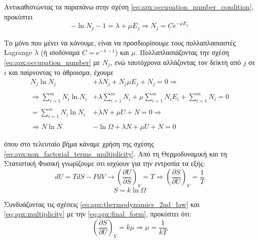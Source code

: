 Αντικαθιστώντας τα παραπάνω στην σχέση \eqref{eq:apx:occupation_number_condition}, προκύπτει
\begin{equation}
    \label{eq:apx:occupation_number}
    - \ln{N_j} - 1 = \lambda + \mu E_j \Rightarrow N_j = C e^{-\mu E_j}
\end{equation}

Το μόνο που μένει να κάνουμε, είναι να προσδιορίσουμε τους πολλαπλασιαστές Lagrange $\lambda$ (ή ισοδύναμα $C = e^{-\lambda - 1}$) και $\mu$. Πολλαπλασιάζοντας την σχέση \eqref{eq:apx:occupation_number} με $N_j$, ενώ ταυτόχρονα αλλάζοντας τον δείκτη από $j$ σε $i$ και παίρνοντας το άθροισμα, έχουμε
\begin{align}
    \label{eq:apx:final_form}
   \nonumber N_j \ln{N_j} &+ \lambda N_j + N_j \mu E_j + N_j = 0 \Rightarrow \\ \nonumber \\
    \nonumber \Rightarrow \sum_{i=1}^{m} N_i \ln{N_i} &+ \lambda \sum_{i=1}^{m} N_i + \mu \sum_{i=1}^{m} N_i E_i + \sum_{i=1}^{m} N_i = 0 \\\nonumber \\
     \nonumber = \sum_{i=1}^{m} N_i \ln{N_i} &+ \lambda N + \mu U + N = 0 \Rightarrow \\\nonumber \\
   \Rightarrow N \ln{N} &- \ln{\Omega} + \lambda N + \mu U + N = 0
\end{align}

όπου στο τελευταίο βήμα κάναμε χρήση της σχέσης \eqref{eq:apx:non_factorial_terms_multiplicity}. Από τη Θερμοδυναμική και τη Στατιστική Φυσική γνωρίζουμε οτι ισχύουν για την εντροπία τα εξής:
\begin{equation}
    \label{eq:apx:thermodynamics_2nd_law}
    dU = TdS - PdV \longrightarrow \left( \frac{\partial U}{\partial S} \right)_V = T \Rightarrow \left( \frac{\partial S}{\partial U} \right)_V = \frac{1}{T}
\end{equation}
\begin{equation}
    \label{eq:apx:multiplicity}
    S = k \ln{\Omega}
\end{equation}

Συνδυάζοντας τις σχέσεις \eqref{eq:apx:thermodynamics_2nd_law} και \eqref{eq:apx:multiplicity} με την \eqref{eq:apx:final_form}, προκύπτει ότι:
\begin{equation}
    \label{eq:apx:mu_value}
    \left( \frac{\partial S}{\partial U} \right)_V = k \mu \Rightarrow \mu = \frac{1}{kT}
\end{equation}

